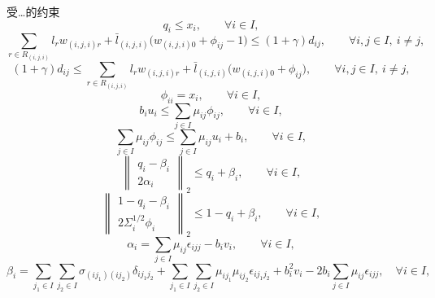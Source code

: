 \documentclass[11pt,a4paper]{article}
\begin{document}
受…的约束
\begin{equation}
q_i \le x_i,
\qquad \forall i \in I,
\tag{M2}
\end{equation}
\begin{equation}
\sum_{r \in R_{(i,j,i)}} l_r w_{(i,j,i)r}
+ \bar{l}_{(i,j,i)} \big(w_{(i,j,i)0} + \phi_{ij} - 1\big)
\le (1+\gamma) d_{ij},
\qquad \forall i,j \in I,\ i \neq j,
\tag{M3}
\end{equation}
\begin{equation}
(1+\gamma) d_{ij}
\le
\sum_{r \in R_{(i,j,i)}} l_r w_{(i,j,i)r}
+ \bar{l}_{(i,j,i)} \big(w_{(i,j,i)0} + \phi_{ij}\big),
\qquad \forall i,j \in I,\ i \neq j,
\tag{M4}
\end{equation}
\begin{equation}
\phi_{ii} = x_i,
\qquad \forall i \in I,
\tag{M5}
\end{equation}
\begin{equation}
b_i u_i \le \sum_{j \in I} \mu_{ij} \phi_{ij},
\qquad \forall i \in I,
\tag{M6}
\end{equation}
\begin{equation}
\sum_{j \in I} \mu_{ij} \phi_{ij}
\le
\sum_{j \in I} \mu_{ij} u_i + b_i,
\qquad \forall i \in I,
\tag{M7}
\end{equation}
\begin{equation}
\left\lVert
\begin{array}{c}
q_i - \beta_i \\
2 \alpha_i
\end{array}
\right\rVert_2
\le q_i + \beta_i,
\qquad \forall i \in I,
\tag{M8}
\end{equation}
\begin{equation}
\left\lVert
\begin{array}{c}
1 - q_i - \beta_i \\
2 \Sigma_i^{1/2} \phi_i
\end{array}
\right\rVert_2
\le 1 - q_i + \beta_i,
\qquad \forall i \in I,
\tag{M9}
\end{equation}
\begin{equation}
\alpha_i = \sum_{j \in I} \mu_{ij} \epsilon_{ijj} - b_i v_i,
\qquad \forall i \in I,
\tag{M10}
\end{equation}
\begin{equation}
\beta_i =
\sum_{j_1 \in I} \sum_{j_2 \in I} \sigma_{(ij_1)(ij_2)} \delta_{ij_1 j_2}
+ \sum_{j_1 \in I} \sum_{j_2 \in I} \mu_{ij_1}\mu_{ij_2} \epsilon_{ij_1 j_2}
+ b_i^2 v_i
- 2 b_i \sum_{j \in I} \mu_{ij} \epsilon_{ijj},
\quad \forall i \in I,
\tag{M11}
\end{equation}
\end{document}
